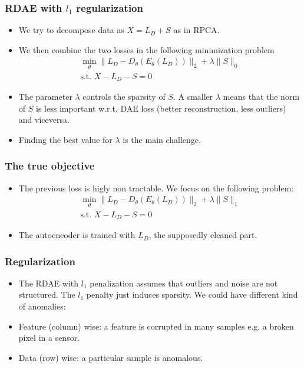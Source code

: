 \documentclass{beamer}
\theoremstyle{plain}
\theoremstyle{definition}
\theoremstyle{remark}
\newcommand{\norm}[1]{\lVert#1\rVert}
\begin{document}
\begin{frame}
	\frametitle{RDAE with $l_1$ regularization}
	\begin{itemize}
		\item We try to decompose data as $X=L_D+S$ as in RPCA.
		\item We then combine the two losses in the following minimization problem
			\begin{align}
				\min_{\theta}{\norm{L_D -D_{\theta}(E_{\theta}(L_D))}_2 + \lambda\norm{S}_0}\\
				\text{s.t. }X-L_D-S=0  
			\end{align}
		\item The parameter $\lambda$ controls the sparsity of $S$. A smaller $\lambda$ means that the norm of $S$ is less important w.r.t. DAE loss (better reconstruction, less outliers) and viceversa.
        \item Finding the best value for $\lambda$ is the main challenge.
    \end{itemize}
\end{frame}
	
\begin{frame}
	\frametitle{The true objective}
	\begin{itemize}
		\item The previous loss is higly non tractable. We focus on the following problem:
			\begin{align}
				\min_{\theta}{\norm{L_D -D_{\theta}(E_{\theta}(L_D))}_2 + \lambda\norm{S}_1}\\
				\text{s.t. }X-L_D-S=0  
			\end{align}
		\item The autoencoder is trained with $L_D$, the supposedly cleaned part.
	\end{itemize}
\end{frame}

\begin{frame}
	\frametitle{Regularization}
	\begin{itemize}
		\item The RDAE with $l_1$ penalization assumes that outliers and noise are not structured. The $l_1$ penalty just induces sparsity. We could have different kind of anomalies:
		\item Feature (column) wise: a feature is corrupted in many samples e.g. a broken pixel in a sensor.
		\item Data (row) wise: a particular sample is anomalous. 
	\end{itemize}
\end{frame}
\end{document}
